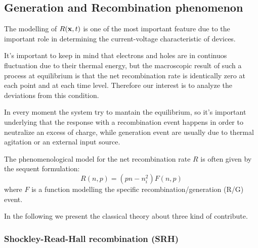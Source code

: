 
\clearpage


\subsection{Generation and Recombination phenomenon}
\label{subsection: RG}

The modelling of $R(\mathbf{x},t)$ is one of the most important feature due to the important role in determining the current-voltage characteristic of devices.
 
It's important to keep in mind that electrons and holes are in continuos fluctuation due to their thermal energy, but the macroscopic result of such a process at equilibrium is that the net recombination rate is identically zero at each point and at each time level. Therefore our interest is to analyze the deviations from this condition. 

In every moment the system try to mantain the equilibrium, so it's important underlying that the response with a recombination event happens in order to neutralize an excess of charge, while generation event are usually due to thermal agitation or an external input source.

The phenomenological model for the net recombination rate $R$ is often given by the sequent formulation:
\begin{equation}
\label{eq: generic RG}
R(n,p) = (pn-n_i^2)F(n,p)
\end{equation}
where $F$ is a function modelling the specific recombination/generation (R/G) event.

In the following we present the classical theory about three kind of contribute. 

\subsubsection{Shockley-Read-Hall recombination (SRH)}

